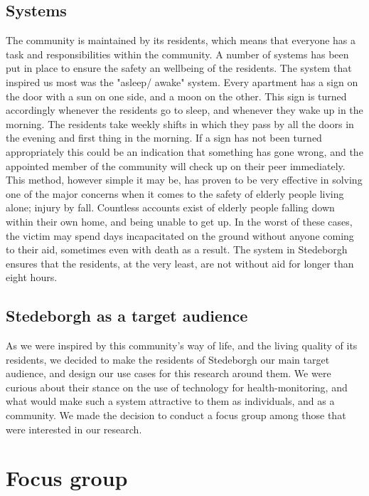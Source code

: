 \documentclass{below-ext}
\begin{document}
\subsection{Systems}
The community is maintained by its residents, which means that everyone has a task and responsibilities within the community. A number of systems has been put in place to ensure the safety an wellbeing of the residents. The system that inspired us most was the "asleep/ awake" system. Every apartment has a sign on the door with a sun on one side, and a moon on the other. This sign is turned accordingly whenever the residents go to sleep, and whenever they wake up in the morning. The residents take weekly shifts in which they pass by all the doors in the evening and first thing in the morning. If a sign has not been turned appropriately this could be an indication that something has gone wrong, and the appointed member of the community will check up on their peer immediately. This method, however simple it may be, has proven to be very effective in solving one of the major concerns when it comes to the safety of elderly people living alone; injury by fall. Countless accounts exist of elderly people falling down within their own home, and being unable to get up. In the worst of these cases, the victim may spend days incapacitated on the ground without anyone coming to their aid, sometimes even with death as a result. The system in Stedeborgh ensures that the residents, at the very least, are not without aid for longer than eight hours. 

\subsection{Stedeborgh as a target audience}
As we were inspired by this community's way of life, and the living quality of its residents, we decided to make the residents of Stedeborgh our main target audience, and design our use cases for this research around them. We were curious about their stance on the use of technology for health-monitoring, and what would make such a system attractive to them as individuals, and as a community. We made the decision to conduct a focus group among those that were interested in our research.

\section{Focus group}
\end{document}
